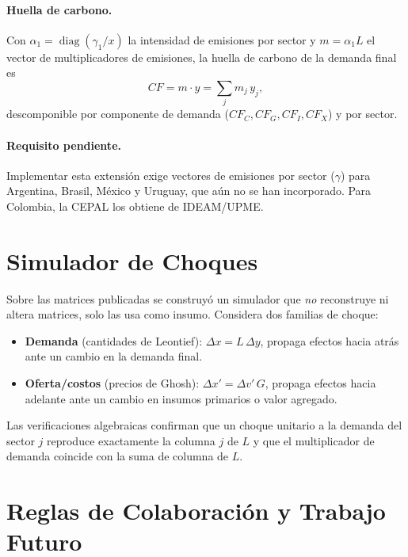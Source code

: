\documentclass[11pt,a4paper]{article}
\newcommand{\diag}{\operatorname{diag}}
\begin{document}
\paragraph{Huella de carbono.}
Con $\alpha_1=\diag(\gamma_1/x)$ la intensidad de emisiones por sector y
$m=\alpha_1 L$ el vector de multiplicadores de emisiones, la huella de carbono de
la demanda final es
\begin{equation}
CF = m\cdot y = \sum_{j} m_j\, y_j,
\end{equation}
descomponible por componente de demanda ($CF_C, CF_G, CF_I, CF_X$) y por sector.

\paragraph{Requisito pendiente.}
Implementar esta extensión exige vectores de emisiones por sector
($\gamma$) para Argentina, Brasil, México y Uruguay, que aún no se han
incorporado. Para Colombia, la CEPAL los obtiene de IDEAM/UPME.

\section{Simulador de Choques}

Sobre las matrices publicadas se construyó un simulador que \emph{no} reconstruye
ni altera matrices, solo las usa como insumo. Considera dos familias de choque:
\begin{itemize}[leftmargin=1.6em,nosep]
  \item \textbf{Demanda} (cantidades de Leontief): $\Delta x = L\,\Delta y$,
        propaga efectos hacia atrás ante un cambio en la demanda final.
  \item \textbf{Oferta/costos} (precios de Ghosh):
        $\Delta x' = \Delta v'\,G$, propaga efectos hacia adelante ante un cambio
        en insumos primarios o valor agregado.
\end{itemize}
Las verificaciones algebraicas confirman que un choque unitario a la demanda del
sector $j$ reproduce exactamente la columna $j$ de $L$ y que el multiplicador de
demanda coincide con la suma de columna de $L$.

\section{Reglas de Colaboración y Trabajo Futuro}
\end{document}
